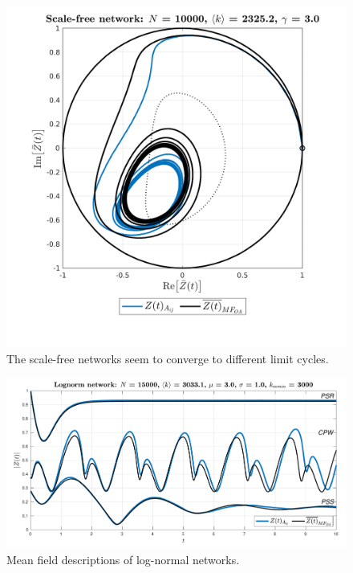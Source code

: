 \begin{figure}[H]
  \includegraphics[width=\linewidth]{../Figures/testScaleFree.png}
  \caption{The scale-free networks seem to converge to different limit cycles.}\label{fig:testScaleFree}
\end{figure}

\begin{figure}[H]
  \includegraphics[width=\linewidth]{../Figures/InspectMeanFieldLogNorm.pdf}
  \caption{Mean field descriptions of log-normal networks.}\label{fig:InspectMeanFieldLogNorm}
\end{figure}



